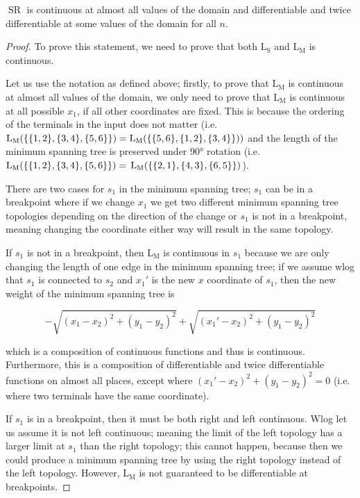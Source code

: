 \documentclass{mpaper}
\begin{document}
\begin{lemma}
  \label{l:2}
  $\operatorname{SR}$ is continuous at almost all values of the domain and differentiable and twice differentiable at some values of the domain for all $n$.
\end{lemma}
\begin{proof}
  To prove this statement, we need to prove that both $\operatorname{L_S}$ and $\operatorname{L_M}$ is continuous.

  Let us use the notation as defined above; firstly, to prove that $\operatorname{L_M}$ is continuous at almost all values of the domain, we only need to prove  that $\operatorname{L_M}$ is continuous at all possible $x_1$, if all other coordinates are fixed. This is because the ordering of the terminals in the input does not matter (i.e. $\operatorname{L_M}(\{\{1,2\}, \{3,4\}, \{5,6\}\})=\operatorname{L_M}(\{\{5,6\}, \{1,2\}, \{3,4\}\}))\\$ and the length of the minimum spanning tree is preserved under 90° rotation (i.e. $\operatorname{L_M}(\{\{1,2\}, \{3,4\}, \{5,6\}\})=\\\operatorname{L_M}(\{\{2,1\}, \{4,3\}, \{6,5\}\})$).

  There are two cases for $s_1$ in the minimum spanning tree; $s_1$ can be in a breakpoint where if we change $x_1$ we get two different minimum spanning tree topologies depending on the direction of the change or $s_1$ is not in a breakpoint, meaning changing the coordinate either way will result in the same topology.

  If $s_1$ is not in a breakpoint, then $\operatorname{L_M}$ is continuous in $s_1$ because we are only changing the length of one edge in the minimum spanning tree; if we assume wlog that $s_1$ is connected to $s_2$ and $x_1'$ is the new $x$ coordinate of $s_1$, then the new weight of the minimum spanning tree is
  
  \begin{equation}
    \label{eq:3}
  -\sqrt{(x_1-x_2)^2 + (y_1-y_2)^2} + \sqrt{(x_1'-x_2)^2 + (y_1-y_2)^2}
  \end{equation}

  which is a composition of continuous functions and thus is continuous. Furthermore, this is a composition of differentiable and twice differentiable functions on almost all places, except where $(x_1'-x_2)^2 + (y_1-y_2)^2 =0$ (i.e. where two terminals have the same coordinate). 

  If $s_1$ is in a breakpoint, then it must be both right and left continuous. Wlog let us assume it is not left continuous; meaning the limit of the left topology has a larger limit at $s_1$ than the right topology; this cannot happen, because then we could produce a minimum spanning tree by using the right topology instead of the left topology. However, $\operatorname{L_M}$ is not guaranteed to be differentiable at breakpoints.


\end{proof}
\end{document}
